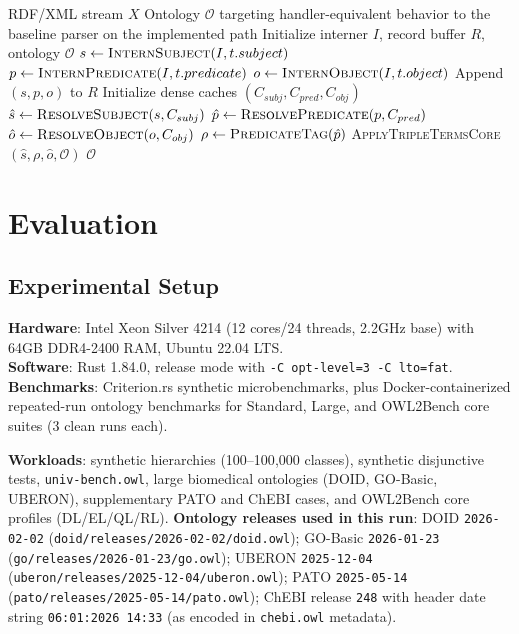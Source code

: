 \documentclass[preprint,12pt,times]{elsarticle}
\begin{document}
\begin{algorithm}[htbp]
\caption{Structural RDF/XML Parse with Handler-Equivalent Materialization}
\label{alg:structural-parser}
\begin{algorithmic}[1]
\Require RDF/XML stream $X$
\Ensure Ontology $\mathcal{O}$ targeting handler-equivalent behavior to the baseline parser on the implemented path
\State Initialize interner $I$, record buffer $R$, ontology $\mathcal{O}$
    \State $s \gets \textsc{InternSubject}(I, t.subject)$
    \State $p \gets \textsc{InternPredicate}(I, t.predicate)$
    \State $o \gets \textsc{InternObject}(I, t.object)$
    \State Append $(s,p,o)$ to $R$
\EndFor
\State Initialize dense caches $(C_{subj}, C_{pred}, C_{obj})$
    \State $\hat{s} \gets \textsc{ResolveSubject}(s, C_{subj})$
    \State $\hat{p} \gets \textsc{ResolvePredicate}(p, C_{pred})$
    \State $\hat{o} \gets \textsc{ResolveObject}(o, C_{obj})$
    \State $\rho \gets \textsc{PredicateTag}(\hat{p})$
    \State \textsc{ApplyTripleTermsCore}$(\hat{s}, \rho, \hat{o}, \mathcal{O})$
\EndFor
\State \Return $\mathcal{O}$
\end{algorithmic}
\end{algorithm}

\section{Evaluation}
\label{sec:evaluation}

\subsection{Experimental Setup}
\label{sec:setup}

\textbf{Hardware}: Intel Xeon Silver 4214 (12 cores/24 threads, 2.2GHz base) with 64GB DDR4-2400 RAM, Ubuntu 22.04 LTS. \\
\textbf{Software}: Rust 1.84.0, release mode with \texttt{-C opt-level=3 -C lto=fat}. \\
\textbf{Benchmarks}: Criterion.rs synthetic microbenchmarks, plus Docker-containerized repeated-run ontology benchmarks for Standard, Large, and OWL2Bench core suites (3 clean runs each).

\textbf{Workloads}: synthetic hierarchies (100--100{,}000 classes), synthetic disjunctive tests, \texttt{univ-bench.owl}, large biomedical ontologies (DOID, GO-Basic, UBERON), supplementary PATO and ChEBI cases, and OWL2Bench core profiles (DL/EL/QL/RL).
\textbf{Ontology releases used in this run}: DOID \texttt{2026-02-02} (\texttt{doid/releases/2026-02-02/doid.owl}); GO-Basic \texttt{2026-01-23} (\texttt{go/releases/2026-01-23/go.owl}); UBERON \texttt{2025-12-04} (\texttt{uberon/releases/2025-12-04/uberon.owl}); PATO \texttt{2025-05-14} (\texttt{pato/releases/2025-05-14/pato.owl}); ChEBI release \texttt{248} with header date string \texttt{06:01:2026 14:33} (as encoded in \texttt{chebi.owl} metadata).
\end{document}
